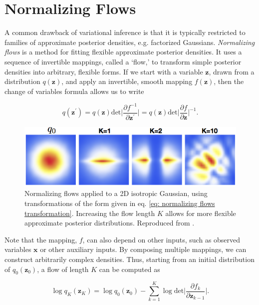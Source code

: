 \section{Normalizing Flows} 

A common drawback of variational inference is that it is typically restricted to families of approximate posterior densities, e.g. factorized Gaussians. \textit{Normalizing flows} \cite{rezende2015variational} is a method for fitting flexible approximate posterior densities. It uses a sequence of invertible mappings, called a `flow,' to transform simple posterior densities into arbitrary, flexible forms. If we start with a variable $\mathbf{z}$, drawn from a distribution $q(\mathbf{z})$, and apply an invertible, smooth mapping $f(\mathbf{z})$, then the change of variables formula allows us to write

\begin{equation}
q(\mathbf{z}^\prime) = q(\mathbf{z}) \text{det} \bigg\vert \frac{\partial f^{-1}}{\partial \mathbf{z}^\prime} \bigg\vert = q(\mathbf{z}) \text{det} \bigg\vert \frac{\partial f}{\partial \mathbf{z}} \bigg\vert^{-1}.
\end{equation}
\newline

\begin{figure}[h]
    \centering
    \includegraphics[width=.6\textwidth]{images/graphical_models/normalizing_flows.png}
    \caption{Normalizing flows applied to a 2D isotropic Gaussian, using transformations of the form given in eq. \ref{eq: normalizing flows transformation}. Increasing the flow length $K$ allows for more flexible approximate posterior distributions. Reproduced from \cite{rezende2015variational}.}
    \label{fig: normalizing flows}
\end{figure}

\noindent Note that the mapping, $f$, can also depend on other inputs, such as observed variables $\mathbf{x}$ or other auxiliary inputs. By composing multiple mappings, we can construct arbitrarily complex densities. Thus, starting from an initial distribution of $q_0 (\mathbf{z}_0)$, a flow of length $K$ can be computed as

\begin{equation}
	\log q_K (\mathbf{z}_K) = \log q_0 (\mathbf{z}_0) - \sum_{k=1}^K \log \text{det}  \bigg\vert \frac{\partial f_k}{\partial \mathbf{z}_{k-1}} \bigg\vert.
\end{equation}

